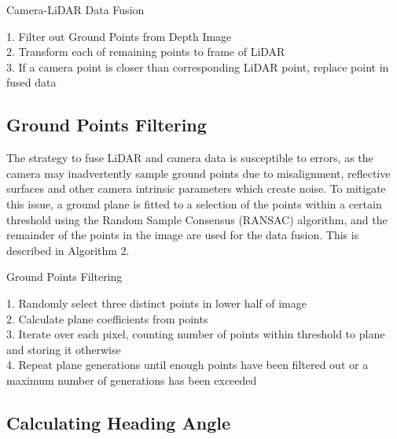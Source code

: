\documentclass[conference]{IEEEtran}
\begin{document}
\begin{algorithm}
\caption{Camera-LiDAR Data Fusion}

        1. Filter out Ground Points from Depth Image\\
        2. Transform each of remaining points to frame of LiDAR\\
        3. If a camera point is closer than corresponding LiDAR point,   replace point in fused data \\

\end{algorithm}

\subsection{Ground Points Filtering}


The strategy to fuse LiDAR and camera data is susceptible to errors, as the camera may inadvertently sample ground points due to misalignment, reflective surfaces and other camera intrinsic parameters which create noise. To mitigate this issue, a ground plane is fitted to a selection of the points within a certain threshold using the Random Sample Consensus (RANSAC) algorithm, and the remainder of the points in the image are used for the data fusion. This is described in Algorithm 2.


\begin{algorithm}
\caption{Ground Points Filtering}

        1. Randomly select three distinct points in lower half of image\\
        2. Calculate plane coefficients from points\\
        3. Iterate over each pixel, counting number of points within threshold to plane and storing it otherwise \\
        4. Repeat plane generations until enough points have been filtered out or a maximum number of generations has been exceeded \\

\end{algorithm}

\subsection{Calculating Heading Angle}
\end{document}
